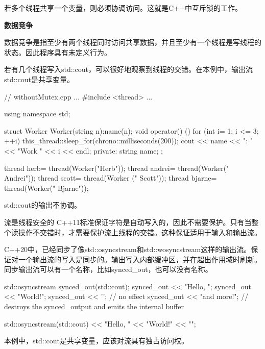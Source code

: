 若多个线程共享一个变量，则必须协调访问。这就是C++中互斥锁的工作。


\noindent
\textbf{数据竞争}

数据竞争是指至少有两个线程同时访问共享数据，并且至少有一个线程是写线程的状态。因此程序具有未定义行为。

若有几个线程写入std::cout，可以很好地观察到线程的交错。在本例中，输出流std::cout是共享变量。


\begin{cpp}
// withoutMutex.cpp
...
#include <thread>
...

using namespace std;

struct Worker{
	Worker(string n):name(n){};
	void operator() (){
		for (int i= 1; i <= 3; ++i){
			this_thread::sleep_for(chrono::milliseconds(200));
			cout << name << ": " << "Work " << i << endl;
		}
	}
	private:
	string name;
};

thread herb= thread(Worker("Herb"));
thread andrei= thread(Worker(" Andrei"));
thread scott= thread(Worker ("     Scott"));
thread bjarne= thread(Worker("       Bjarne"));
\end{cpp}


std::cout的输出不协调。

\begin{myTip}{流是线程安全的}
C++11标准保证字符是自动写入的，因此不需要保护。只有当整个读操作不交错时，才需要保护流上线程的交错。这种保证适用于输入和输出流。

C++20中，已经同步了像std::osyncstream和std::wosyncstream这样的输出流。保证对一个输出流的写入是同步的。输出写入内部缓冲区，并在超出作用域时刷新。同步输出流可以有一个名称，比如synced\_out，也可以没有名称。


\begin{cpp}
{
	std::osyncstream synced_out(std::cout);
	synced_out << "Hello, ";
	synced_out << "World!";
	synced_out << '\n'; // no effect
	synced_out << "and more!\n";
} // destroys the synced_output and emits the internal buffer

std::osyncstream(std::cout) << "Hello, " << "World!" << "\n";
\end{cpp}
\end{myTip}

本例中，std::cout是共享变量，应该对流具有独占访问权。

